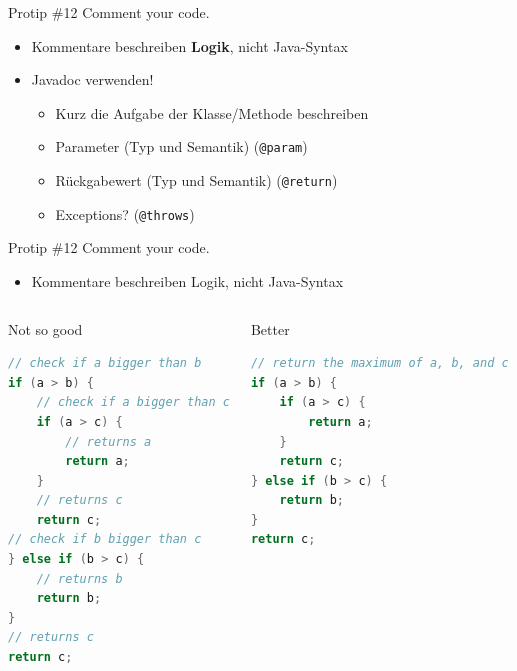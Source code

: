 \documentclass[18pt]{beamer}
\begin{document}
\begin{frame}{Protip \#12 Comment your code.}
    \begin{itemize}
        \item Kommentare beschreiben \textbf{Logik}, nicht Java-Syntax
        \item Javadoc verwenden!
        \begin{itemize}
            \item Kurz die Aufgabe der Klasse/Methode beschreiben
            \item Parameter (Typ und Semantik) (\texttt{@param})
            \item Rückgabewert (Typ und Semantik) (\texttt{@return})
            \item Exceptions? (\texttt{@throws})
        \end{itemize}
    \end{itemize}
\end{frame}

\begin{frame}[fragile]{Protip \#12 Comment your code.}
    \begin{itemize}
        \item Kommentare beschreiben Logik, nicht Java-Syntax
    \end{itemize}
    \begin{columns}[c]
        \begin{alertblock}{Not so good}
            \begin{lstlisting}[language=Java,basicstyle=\scriptsize]
// check if a bigger than b
if (a > b) {
    // check if a bigger than c
    if (a > c) {
        // returns a
        return a;
    }
    // returns c
    return c;
// check if b bigger than c
} else if (b > c) {
    // returns b
    return b;
}
// returns c
return c;
            \end{lstlisting}
        \end{alertblock}
        \begin{exampleblock}{Better}
            \begin{lstlisting}[language=Java,basicstyle=\scriptsize]
// return the maximum of a, b, and c
if (a > b) {
    if (a > c) {
        return a;
    }
    return c;
} else if (b > c) {
    return b;
}
return c;
            \end{lstlisting}
        \end{exampleblock}
    \end{columns}
\end{frame}
\end{document}
